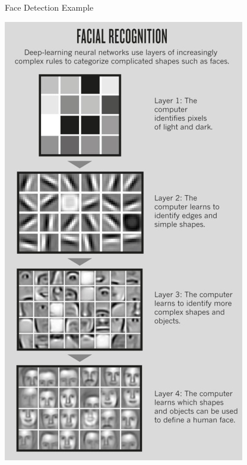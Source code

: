 \documentclass[xcolor=pdftex,x11names,table,hyperref]{beamer}
\begin{document}
\begin{frame}{Face Detection Example}
	\begin{center}
	\includegraphics[height=0.90\textheight]{images/deep_cnn_face.jpg}
	\end{center}
\end{frame}
\end{document}
